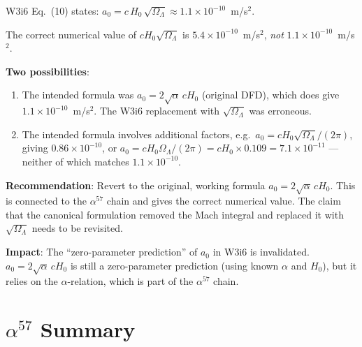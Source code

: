 \documentclass[11pt]{article}
\newcommand{\ee}[1]{\times 10^{#1}}
\newcommand{\aM}{a_0}
\newcommand{\Hzero}{H_0}
\begin{document}
\begin{tcolorbox}[colback=red!5!white, colframe=red!60!black,
  title=\textbf{CRITICAL: W3i6 MOND Formula Error}]

W3i6 Eq.~(10) states:
$\aM = c\,\Hzero\,\sqrt{\Omega_\Lambda} \approx 1.1\ee{-10}$~m/s$^2$.

The correct numerical value of $c\Hzero\sqrt{\Omega_\Lambda}$ is
$5.4\ee{-10}$~m/s$^2$, \emph{not} $1.1\ee{-10}$~m/s$^2$.

\textbf{Two possibilities}:
\begin{enumerate}
\item The intended formula was $\aM = 2\sqrt{\alpha}\,c\Hzero$
  (original DFD), which does give $1.1\ee{-10}$~m/s$^2$. The W3i6
  replacement with $\sqrt{\Omega_\Lambda}$ was erroneous.
\item The intended formula involves additional factors, e.g.\
  $\aM = c\Hzero\sqrt{\Omega_\Lambda}/(2\pi)$, giving $0.86\ee{-10}$,
  or $\aM = c\Hzero\Omega_\Lambda/(2\pi) = c\Hzero \times 0.109
  = 7.1\ee{-11}$ --- neither of which matches $1.1\ee{-10}$.
\end{enumerate}

\textbf{Recommendation}: Revert to the original, working formula
$\aM = 2\sqrt{\alpha}\,c\Hzero$. This is connected to the $\alpha^{57}$
chain and gives the correct numerical value. The claim that the
canonical formulation removed the Mach integral and replaced it with
$\sqrt{\Omega_\Lambda}$ needs to be revisited.

\textbf{Impact}: The ``zero-parameter prediction'' of $\aM$ in W3i6
is invalidated. $\aM = 2\sqrt{\alpha}\,c\Hzero$ is still a zero-parameter
prediction (using known $\alpha$ and $\Hzero$), but it relies on the
$\alpha$-relation, which is part of the $\alpha^{57}$ chain.
\end{tcolorbox}

\section{$\alpha^{57}$ Summary}
\label{sec:alpha57-summary}
\end{document}
